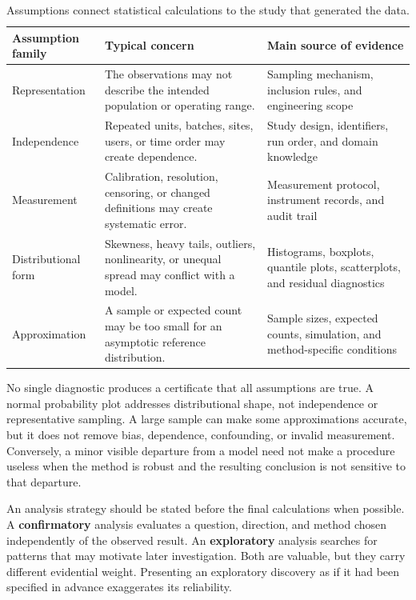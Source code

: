 \begin{table}[htbp]
\centering
\caption{Assumptions connect statistical calculations to the study that generated the data.}
\label{tab:integrated-assumption-families}
\begin{tabularx}{\textwidth}{@{}l>{\raggedright\arraybackslash}X>{\raggedright\arraybackslash}X@{}}
\toprule
Assumption family & Typical concern & Main source of evidence \\
\midrule
Representation & The observations may not describe the intended population or operating range. & Sampling mechanism, inclusion rules, and engineering scope \\
Independence & Repeated units, batches, sites, users, or time order may create dependence. & Study design, identifiers, run order, and domain knowledge \\
Measurement & Calibration, resolution, censoring, or changed definitions may create systematic error. & Measurement protocol, instrument records, and audit trail \\
Distributional form & Skewness, heavy tails, outliers, nonlinearity, or unequal spread may conflict with a model. & Histograms, boxplots, quantile plots, scatterplots, and residual diagnostics \\
Approximation & A sample or expected count may be too small for an asymptotic reference distribution. & Sample sizes, expected counts, simulation, and method-specific conditions \\
\bottomrule
\end{tabularx}
\end{table}

\FloatBarrier

No single diagnostic produces a certificate that all assumptions are true. A normal probability plot addresses distributional shape, not independence or representative sampling. A large sample can make some approximations accurate, but it does not remove bias, dependence, confounding, or invalid measurement. Conversely, a minor visible departure from a model need not make a procedure useless when the method is robust and the resulting conclusion is not sensitive to that departure.

An analysis strategy should be stated before the final calculations when possible. A \textbf{confirmatory} analysis evaluates a question, direction, and method chosen independently of the observed result. An \textbf{exploratory} analysis searches for patterns that may motivate later investigation. Both are valuable, but they carry different evidential weight. Presenting an exploratory discovery as if it had been specified in advance exaggerates its reliability.


